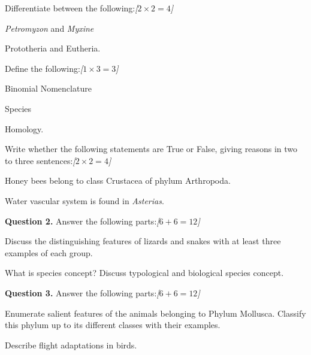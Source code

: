 \documentclass[11pt,a4paper]{article}
\newcommand{\pts}[1]{\hfill   \textit{[#1]}}
\begin{document}
\begin{parts}
  \item Differentiate between the following:\pts{$2  \times 2 = 4$}
  
\begin{parts}
    \item   \textit{Petromyzon} and   \textit{Myxine}
    \item Prototheria and Eutheria.
  \end{parts}

  \item Define the following:\pts{$1  \times 3 = 3$}
  
\begin{parts}
    \item Binomial Nomenclature
    \item Species
    \item Homology.
  \end{parts}

  \item Write whether the following statements are True or False, giving reasons in two to three sentences:\pts{$2  \times 2 = 4$}
  
\begin{parts}
    \item Honey bees belong to class Crustacea of phylum Arthropoda.
    \item Water vascular system is found in   \textit{Asterias}.
  \end{parts}
\end{parts}

\medskip


\noindent   \textbf{Question 2.} Answer the following parts:\pts{$6 + 6 = 12$}

\begin{parts}
  \item Discuss the distinguishing features of lizards and snakes with at least three examples of each group.
  \item What is species concept? Discuss typological and biological species concept.
\end{parts}

\medskip


\noindent   \textbf{Question 3.} Answer the following parts:\pts{$6 + 6 = 12$}

\begin{parts}
  \item Enumerate salient features of the animals belonging to Phylum Mollusca. Classify this phylum up to its different classes with their examples.
  \item Describe flight adaptations in birds.
\end{parts}
\end{document}
